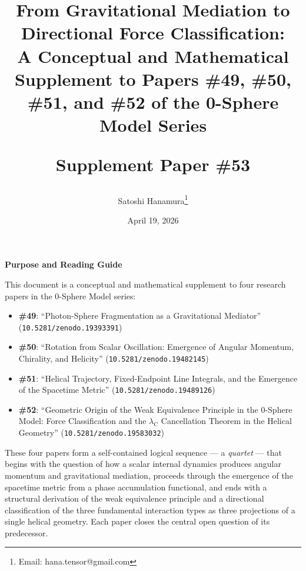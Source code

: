 \documentclass[12pt,letterpaper]{article}
\newcommand{\doilink}[1]{\texttt{#1}}
\newcommand{\paperno}[1]{\textbf{\#{}#1}}
\newcommand{\lambdaC}{\lambda_{\mathrm{C}}}
\begin{document}
\sloppy

\title{From Gravitational Mediation to Directional Force Classification:\\
\large A Conceptual and Mathematical Supplement to Papers \#49, \#50, \#51, and \#52 of the 0-Sphere Model Series\par\vspace{6pt}
{\normalsize Supplement Paper \#53}}

\author{Satoshi Hanamura\thanks{Email: hana.tensor@gmail.com}}
\date{April 19, 2026}

\maketitle

\tableofcontents
\clearpage

\begin{center}
\textbf{\large Purpose and Reading Guide}
\end{center}
\justifying

\noindent This document is a conceptual and mathematical supplement to four research papers
in the 0-Sphere Model series:
\begin{itemize}[leftmargin=2em]
  \item \paperno{49}: ``Photon-Sphere Fragmentation as a Gravitational Mediator''
        (\doilink{10.5281/zenodo.19393391})
  \item \paperno{50}: ``Rotation from Scalar Oscillation: Emergence of Angular Momentum,
        Chirality, and Helicity'' (\doilink{10.5281/zenodo.19482145})
  \item \paperno{51}: ``Helical Trajectory, Fixed-Endpoint Line Integrals, and the
        Emergence of the Spacetime Metric'' (\doilink{10.5281/zenodo.19489126})
  \item \paperno{52}: ``Geometric Origin of the Weak Equivalence Principle in the 0-Sphere Model: Force Classification and the $\lambdaC$ Cancellation Theorem in the Helical Geometry'' (\doilink{10.5281/zenodo.19583032})
\end{itemize}

\noindent These four papers form a self-contained logical sequence
--- a \emph{quartet} --- that begins with the question of how a scalar internal dynamics
produces angular momentum and gravitational mediation, proceeds through the emergence
of the spacetime metric from a phase accumulation functional, and ends with a structural
derivation of the weak equivalence principle and a directional classification of the
three fundamental interaction types as three projections of a single helical geometry.
Each paper closes the central open question of its predecessor.
\end{document}
